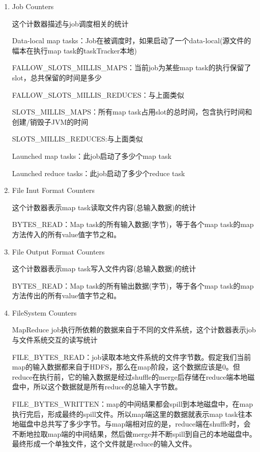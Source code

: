\begin{enumerate}

\item Job Counters 

这个计数器描述与job调度相关的统计 

Data-local map tasks：Job在被调度时，如果启动了一个data-local(源文件的幅本在执行map task的taskTracker本地) 

FALLOW\_SLOTS\_MILLIS\_MAPS：当前job为某些map task的执行保留了slot，总共保留的时间是多少 

FALLOW\_SLOTS\_MILLIS\_REDUCES：与上面类似 

SLOTS\_MILLIS\_MAPS：所有map task占用slot的总时间，包含执行时间和创建/销毁子JVM的时间 

SLOTS\_MILLIS\_REDUCES:与上面类似 

Launched map tasks：此job启动了多少个map task 

Launched reduce tasks：此job启动了多少个reduce task 


\item File Inut Format Counters

这个计数器表示map task读取文件内容(总输入数据)的统计

BYTES\_READ：Map task的所有输入数据(字节)，等于各个map task的map方法传入的所有value值字节之和。 

\item File Output Format Counters

这个计数器表示map task写入文件内容(总输入数据)的统计

BYTES\_READ：Map task的所有输出数据(字节)，等于各个map task的map方法传出的所有value值字节之和。 

\item FileSystem Counters

MapReduce job执行所依赖的数据来自于不同的文件系统，这个计数器表示job与文件系统交互的读写统计 

FILE\_BYTES\_READ：job读取本地文件系统的文件字节数。假定我们当前map的输入数据都来自于HDFS，那么在map阶段，这个数据应该是0。但reduce在执行前，它的输入数据是经过shuffle的merge后存储在reduce端本地磁盘中，所以这个数据就是所有reduce的总输入字节数。 

FILE\_BYTES\_WRITTEN：map的中间结果都会spill到本地磁盘中，在map执行完后，形成最终的spill文件。所以map端这里的数据就表示map task往本地磁盘中总共写了多少字节。与map端相对应的是，reduce端在shuffle时，会不断地拉取map端的中间结果，然后做merge并不断spill到自己的本地磁盘中。最终形成一个单独文件，这个文件就是reduce的输入文件。 


\end{enumerate}
